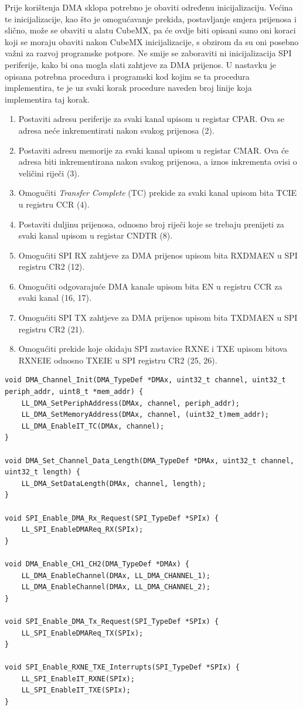 Prije korištenja DMA sklopa potrebno je obaviti određenu inicijalizaciju. Većina te inicijalizacije, kao što je omogućavanje prekida, postavljanje smjera prijenosa i slično, može se obaviti u alatu CubeMX, pa će ovdje biti opisani samo oni koraci koji se moraju obaviti nakon CubeMX inicijalizacije, s obzirom da su oni posebno važni za razvoj programske potpore. Ne smije se zaboraviti ni inicijalizacija SPI periferije, kako bi ona mogla slati zahtjeve za DMA prijenos. U nastavku je opisana potrebna procedura i programski kod kojim se ta procedura implementira, te je uz svaki korak procedure naveden broj linije koja implementira taj korak.

\begin{enumerate}
	\item Postaviti adresu periferije za svaki kanal upisom u registar CPAR. Ova se adresa neće inkrementirati nakon svakog prijenosa (2).
	\item Postaviti adresu memorije za svaki kanal upisom u registar CMAR. Ova će adresa biti inkrementirana nakon svakog prijenosa, a iznos inkrementa ovisi o veličini riječi (3).
	\item Omogućiti \textit{Transfer Complete} (TC) prekide za svaki kanal upisom bita TCIE u registru CCR (4).
	\item Postaviti duljinu prijenosa, odnosno broj riječi koje se trebaju prenijeti za svaki kanal upisom u registar CNDTR (8).
	\item Omogućiti SPI RX zahtjeve za DMA prijenos upisom bita RXDMAEN u SPI registru CR2 (12).
	\item Omogućiti odgovarajuće DMA kanale upisom bita EN u registru CCR za svaki kanal (16, 17).
	\item Omogućiti SPI TX zahtjeve za DMA prijenos upisom bita TXDMAEN u SPI registru CR2 (21).
	\item Omogućiti prekide koje okidaju SPI zastavice RXNE i TXE upisom bitova RXNEIE odnosno TXEIE u SPI registru CR2 (25, 26).
\end{enumerate}

\begin{lstlisting}[caption={Inicijalizacija DMA sklopa za SPI prijenos u \textit{Full Duplex} načinu rada}]
void DMA_Channel_Init(DMA_TypeDef *DMAx, uint32_t channel, uint32_t periph_addr, uint8_t *mem_addr) {
	LL_DMA_SetPeriphAddress(DMAx, channel, periph_addr);
	LL_DMA_SetMemoryAddress(DMAx, channel, (uint32_t)mem_addr);
	LL_DMA_EnableIT_TC(DMAx, channel);
}

void DMA_Set_Channel_Data_Length(DMA_TypeDef *DMAx, uint32_t channel, uint32_t length) {
	LL_DMA_SetDataLength(DMAx, channel, length);
}

void SPI_Enable_DMA_Rx_Request(SPI_TypeDef *SPIx) {
	LL_SPI_EnableDMAReq_RX(SPIx);
}

void DMA_Enable_CH1_CH2(DMA_TypeDef *DMAx) {
	LL_DMA_EnableChannel(DMAx, LL_DMA_CHANNEL_1);
	LL_DMA_EnableChannel(DMAx, LL_DMA_CHANNEL_2);
}

void SPI_Enable_DMA_Tx_Request(SPI_TypeDef *SPIx) {
	LL_SPI_EnableDMAReq_TX(SPIx);
}

void SPI_Enable_RXNE_TXE_Interrupts(SPI_TypeDef *SPIx) {
	LL_SPI_EnableIT_RXNE(SPIx);
	LL_SPI_EnableIT_TXE(SPIx);
}
\end{lstlisting}

